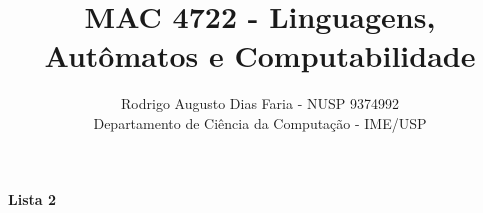 \documentclass[12pt]{article}
\begin{document}
\title{MAC 4722 - Linguagens, Autômatos e Computabilidade}
\author{Rodrigo Augusto Dias Faria - NUSP 9374992\\
Departamento de Ciência da Computação - IME/USP}

\maketitle

%
%
%

\begin{center}
\textbf{\large{Lista 2}}
\end{center}


\end{document}
